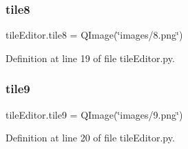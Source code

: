 \subsubsection{\texorpdfstring{tile8}{tile8}}
{\footnotesize\ttfamily tile\+Editor.\+tile8 = Q\+Image(\char`\"{}images/8.png\char`\"{})}



Definition at line 19 of file tile\+Editor.\+py.

\mbox{\label{namespacetile_editor_a56d11758002ce1e726a19b2da0b33cea}} 
\subsubsection{\texorpdfstring{tile9}{tile9}}
{\footnotesize\ttfamily tile\+Editor.\+tile9 = Q\+Image(\char`\"{}images/9.png\char`\"{})}



Definition at line 20 of file tile\+Editor.\+py.

